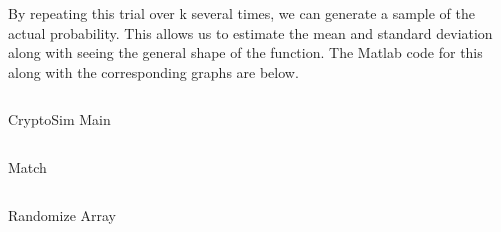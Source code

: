 \documentclass{article}
\begin{document}
      By repeating this trial over k several times, we can generate
      a sample of the actual probability. This allows us to estimate
      the mean and standard deviation along with seeing the general
      shape of the function. The Matlab code for this along with
      the corresponding graphs are below.

      \begin{listing}[H]
         \inputminted[linenos]{matlab}{../../crypto_sim.m}
         \caption{CryptoSim Main}
      \end{listing}
      \begin{listing}[H]
         \inputminted[linenos]{matlab}{../../match.m}
         \caption{Match}
      \end{listing}
      \begin{listing}[H]
         \inputminted[linenos]{matlab}{../../randomize_array.m}
         \caption{Randomize Array}
      \end{listing}
\end{document}
